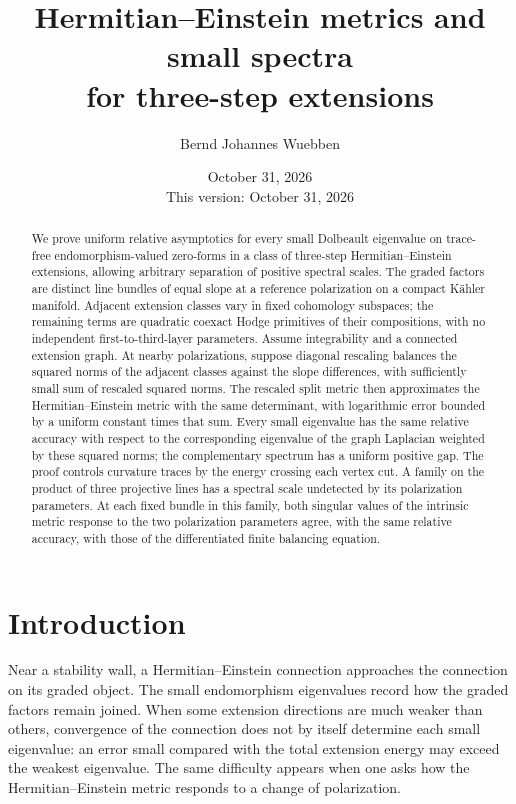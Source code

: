 \documentclass[11pt]{amsart}
\title[Metrics and small spectra for three-step extensions]{Hermitian--Einstein metrics and small spectra\\for three-step extensions}
\author{Bernd Johannes Wuebben}
\date{October 31, 2026\\This version: October 31, 2026}
\theoremstyle{definition}
\theoremstyle{remark}
\begin{document}
\begin{abstract}
We prove uniform relative asymptotics for every small Dolbeault
eigenvalue on trace-free endomorphism-valued zero-forms in a class of
three-step Hermitian--Einstein extensions, allowing arbitrary separation
of positive spectral scales. The graded factors are distinct line bundles
of equal slope at a reference polarization on a compact K\"ahler manifold.
Adjacent extension classes vary in fixed cohomology subspaces; the
remaining terms are quadratic coexact Hodge primitives of their
compositions, with no independent first-to-third-layer parameters.
Assume integrability and a connected extension graph. At nearby
polarizations, suppose diagonal rescaling balances the squared norms
of the adjacent classes against the slope differences, with sufficiently
small sum of rescaled squared norms. The rescaled split metric then
approximates the Hermitian--Einstein metric with the same determinant,
with logarithmic error bounded by a uniform constant times that sum.
Every small eigenvalue has the same relative accuracy with respect to
the corresponding eigenvalue of the graph Laplacian weighted by these
squared norms;
the complementary spectrum has a uniform positive gap. The proof
controls curvature traces by the energy crossing each vertex cut.
A family on the product of three projective lines has a spectral scale
undetected by its polarization parameters. At each fixed bundle in
this family, both singular values of the intrinsic metric response to
the two polarization parameters agree, with the same relative accuracy,
with those of the differentiated finite balancing equation.
\end{abstract}

\maketitle


\section{Introduction}\label{sec:introduction}

Near a stability wall, a Hermitian--Einstein connection approaches the
connection on its graded object. The small endomorphism eigenvalues record
how the graded factors remain joined. When some extension directions are
much weaker than others, convergence of the connection does not by itself
determine each small eigenvalue: an error small compared with the total
extension energy may exceed the weakest eigenvalue. The same difficulty
appears when one asks how the Hermitian--Einstein metric responds to a
change of polarization.
\end{document}
